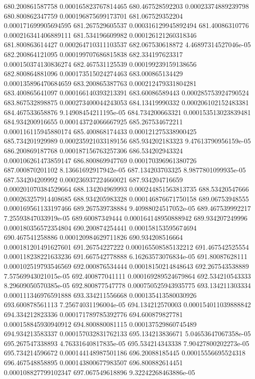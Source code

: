 {680.200861587758 0.000165823767814465
680.467528592203 0.00023374889239798
680.800862347759 0.000196875699173701
681.067529352204 0.000171699905694595
681.267529605537 0.000316129945892494
681.40086310776 0.000216341406889111
681.534196609982 0.000126121260318346
681.800863614427 0.000264710311103537
682.067530618872 4.46897314527046e-05
682.200864121095 0.000199707686815838
682.334197623317 0.000150374130836274
682.467531125539 0.000199239159138656
682.800864881096 0.000173515024274463
683.000865134429 0.000135896470684659
683.200865387763 0.000212479331804281
683.400865641097 0.000166140393213391
683.60086589443 0.000285753924790524
683.867532898875 0.000273400044243053
684.13419990332 0.000206102152483381
684.467533658876 9.14908454211195e-05
684.734200663321 0.000153513023839481
684.934200916655 0.000143724066667925
685.267534672211 0.000116115945880174
685.400868174433 0.000121275338900425
685.734201929989 0.000235921033189156
685.934202183323 9.47613790956159e-05
686.200869187768 0.000187156763257306
686.534202943324 0.000106261473859147
686.800869947769 0.000170396961380726
687.000870201102 8.13661692917942e-05
687.134203703325 8.9877801099935e-05
687.534204209992 0.000236937224660021
687.934204716659 0.000201070384529664
688.134204969993 0.000244851563813735
688.53420547666 0.000263257914408685
688.934205983328 0.000146876671750158
689.06753948555 0.000169561133197466
689.267539738884 9.40988024517052e-05
689.467539992217 7.25593847033919e-05
689.60087349444 0.000164148950888942
689.934207249996 0.000180356572354804
690.200874254441 0.000158153595674694
690.467541258886 0.000120984629711826
690.934208516664 0.000181201491627601
691.26754227222 0.000165508585132212
691.467542525554 0.000118238221633236
691.667542778888 6.16263573076834e-05
691.80087628111 0.000102519793546569
692.000876534444 0.00018150214848643
692.267543538889 7.57569943021015e-05
692.400877041111 0.000169289524679864
692.534210543333 8.29609050570385e-05
692.800877547778 0.000750525943935775
693.134211303334 0.000111346976591888
693.334211556668 0.000135413580030926
693.600878561113 7.25674031196004e-05
694.134212570003 0.000154011039888842
694.334212823336 0.000171789785392776
694.600879827781 0.000158845930940912
694.800880081115 0.000137529860745489
694.934213583337 0.000157032831762133
695.134213836671 5.04653647067358e-05
695.267547338893 4.76331640817835e-05
695.534214343338 7.90427800202273e-05
695.734214596672 0.000144148987501186
696.20088185445 0.00015556695524318
696.467548858895 0.000143800677983507
696.800882614451 0.000108827799102347
697.067549618896 9.32242268463886e-05
}
